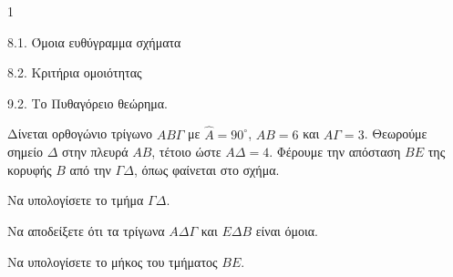\begin{ylh}{1}
    \item 8.1. Όμοια ευθύγραμμα σχήματα
    \item 8.2. Κριτήρια ομοιότητας
    \item 9.2. Το Πυθαγόρειο θεώρημα.
\end{ylh}
\begin{figure}
    \centering
\end{figure}

Δίνεται ορθογώνιο τρίγωνο $AB\Gamma$ με $\hat{A} = 90^\circ$, $AB = 6$ και $A\Gamma = 3$. Θεωρούμε σημείο $\Delta$ στην πλευρά $AB$, τέτοιο ώστε $A\Delta = 4$. Φέρουμε την απόσταση $BE$ της κορυφής $B$ από την $\Gamma\Delta$, όπως φαίνεται στο σχήμα.
\begin{alist}
    \item Να υπολογίσετε το τμήμα $\Gamma\Delta$. 
    \item Να αποδείξετε ότι τα τρίγωνα $A\Delta\Gamma$ και $E\Delta B$ είναι όμοια. 
    \item Να υπολογίσετε το μήκος του τμήματος $BE$. 
\end{alist}